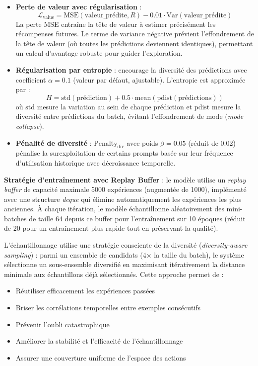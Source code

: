 \begin{enumerate}
\begin{itemize}
        \item \textbf{Perte de valeur avec régularisation} : 
        \[
        \mathcal{L}_{\text{value}} = \text{MSE}(\text{valeur\_prédite}, R) - 0.01 \cdot \text{Var}(\text{valeur\_prédite})
        \]
        La perte MSE entraîne la tête de valeur à estimer précisément les récompenses futures. Le terme de variance négative prévient l'effondrement de la tête de valeur (où toutes les prédictions deviennent identiques), permettant un calcul d'avantage robuste pour guider l'exploration.
        
        \item \textbf{Régularisation par entropie} : encourage la diversité des prédictions avec coefficient $\alpha = 0.1$ (valeur par défaut, ajustable). L'entropie est approximée par :
        \[
        H = \text{std}(\text{prédiction}) + 0.5 \cdot \text{mean}(\text{pdist}(\text{prédictions}))
        \]
        où $\text{std}$ mesure la variation au sein de chaque prédiction et $\text{pdist}$ mesure la diversité entre prédictions du batch, évitant l'effondrement de mode (\textit{mode collapse}).
        
        \item \textbf{Pénalité de diversité} : $\text{Penalty}_{\text{div}}$ avec poids $\beta = 0.05$ (réduit de 0.02) pénalise la surexploitation de certains prompts basée sur leur fréquence d'utilisation historique avec décroissance temporelle.
    \end{itemize}
    
    \textbf{Stratégie d'entraînement avec Replay Buffer} : le modèle utilise un \textit{replay buffer} de capacité maximale 5000 expériences (augmentée de 1000), implémenté avec une structure \textit{deque} qui élimine automatiquement les expériences les plus anciennes. À chaque itération, le modèle échantillonne aléatoirement des mini-batches de taille 64 depuis ce buffer pour l'entraînement sur 10 époques (réduit de 20 pour un entraînement plus rapide tout en préservant la qualité). 
    
    L'échantillonnage utilise une stratégie consciente de la diversité (\textit{diversity-aware sampling}) : parmi un ensemble de candidats (4× la taille du batch), le système sélectionne un sous-ensemble diversifié en maximisant itérativement la distance minimale aux échantillons déjà sélectionnés. Cette approche permet de :
    \begin{itemize}
        \item Réutiliser efficacement les expériences passées
        \item Briser les corrélations temporelles entre exemples consécutifs
        \item Prévenir l'oubli catastrophique
        \item Améliorer la stabilité et l'efficacité de l'échantillonnage
        \item Assurer une couverture uniforme de l'espace des actions
    \end{itemize}
    

\end{enumerate}
